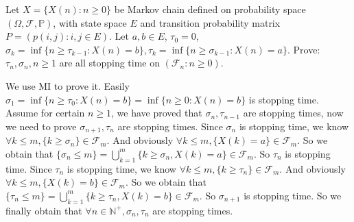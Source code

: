 \documentclass[../main]{subfiles}
\begin{document}
\begin{problem}\label{pro:1}
  Let \(X=\{X(n): n \geq 0\}\) be Markov chain defined on probability space \((\Omega,\mathscr{F},\mathbb{P})\), with state space \(E\) and
  transition probability matrix \(P=(p(i,j):i,j \in E)\). Let \(a, b \in E\), \(\tau_0 =0\), \(\sigma_k = \inf \{n \geq \tau_{k-1}: X(n)=b\}, \tau_k=\inf\{n \geq \sigma_{k-1}: X(n)=a\}\).
  Prove: \(\tau_n,\sigma_n, n \geq 1 \) are all stopping time on \((\mathscr{F}_n: n \geq 0)\).
\end{problem}

\begin{solution}
  We use MI to prove it. Easily \(\sigma_1=\inf \{n \geq \tau_0:X(n)=b\}=\inf \{n \geq 0:X(n)=b\}\) is stopping time.
  Assume for certain \(n \geq 1\), we have proved that \(\sigma_n,\tau_{n-1}\) are stopping times, now we need to prove \(\sigma_{n+1},\tau_n\) are stopping times.
  Since \(\sigma_n\) is stopping time, we know \(\forall k \leq m,\{k \geq \sigma_n\} \in \mathcal{F}_m\).
  And obviously \(\forall k \leq m,\{X(k)=a\}\in \mathcal{F}_m\). So we obtain that \(\{\sigma_n \leq m\}=\bigcup_{k=1}^{m} \{k \geq \sigma_n,X(k)=a\} \in \mathcal{F}_m\).
  So \(\tau_n\) is stopping time.
  Since \(\tau_n\) is stopping time, we know \(\forall k \leq m,\{k \geq \tau_n\} \in \mathcal{F}_m\).
  And obviously \(\forall k \leq m,\{X(k)=b\}\in \mathcal{F}_m\). So we obtain that \(\{\tau_n \leq m\}=\bigcup_{k=1}^{m} \{k \geq \tau_n,X(k)=b\} \in \mathcal{F}_m\).
  So \(\sigma_{n+1}\) is stopping time.
  So we finally obtain that \(\forall n \in \mathbb{N}^+,\sigma_n,\tau_n\) are stopping times.
\end{solution}
\end{document}
